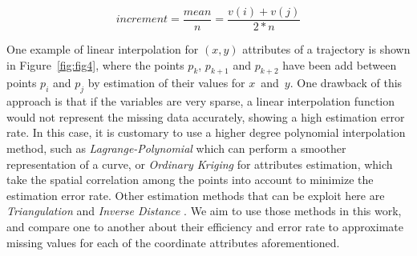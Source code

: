 \documentclass[a4paper,12pt]{article}
\begin{document}
\[
	increment = \frac{mean}{n} = \frac{v(i)+v(j)}{2*n}
\]

One example of linear interpolation for $(x, y)$ attributes of a trajectory is shown in Figure~\ref{fig:fig4}, where the points $p_k$, $p_{k+1}$ and $p_{k+2}$ have been add between points $p_i$ and $p_j$ by estimation of their values for $x$~and~$y$. One drawback of this approach is that if the variables are very sparse, a linear interpolation function would not represent the missing data accurately, showing a high estimation error rate. In this case, it is customary to use a higher degree polynomial interpolation method, such as \textit{Lagrange-Polynomial} which can perform a smoother representation of a curve, or \textit{Ordinary Kriging} for attributes estimation, which take the spatial correlation among the points into account to minimize the estimation error rate. Other estimation methods that can be exploit here are \textit{Triangulation} and \textit{Inverse Distance} \cite{isaaks90}. We aim to use those methods in this work, and compare one to another about their efficiency and error rate to approximate missing values for each of the coordinate attributes aforementioned.
 	
\end{document}

